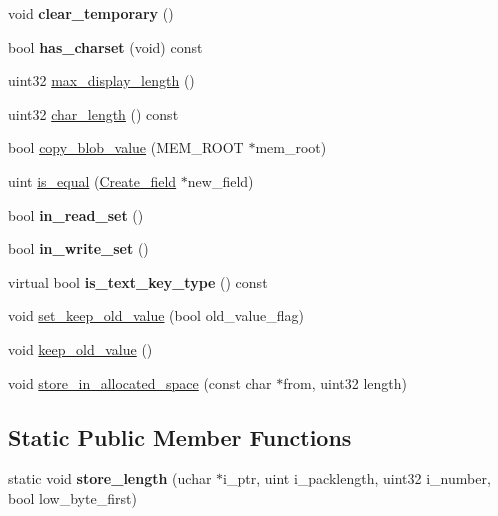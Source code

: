 \begin{DoxyCompactItemize}
\mbox{\label{classField__blob_ae641858be5af69680ab08ab07e4a87f3}} 
void {\bfseries clear\+\_\+temporary} ()
\item 
\mbox{\label{classField__blob_a9f63570780e08d9642f43f8beb7b5bf4}} 
bool {\bfseries has\+\_\+charset} (void) const
\item 
uint32 \mbox{\hyperlink{classField__blob_a6f8231d7a8e2b8f319cf9bfc1a284252}{max\+\_\+display\+\_\+length}} ()
\item 
uint32 \mbox{\hyperlink{classField__blob_af7479466787f51794b98d42baf338741}{char\+\_\+length}} () const
\item 
bool \mbox{\hyperlink{classField__blob_ac822037d569ad65e04c3f938382eef0b}{copy\+\_\+blob\+\_\+value}} (M\+E\+M\+\_\+\+R\+O\+OT $\ast$mem\+\_\+root)
\item 
uint \mbox{\hyperlink{classField__blob_aad2a7c5fe21d9c7cfd20aeea52c58ed5}{is\+\_\+equal}} (\mbox{\hyperlink{classCreate__field}{Create\+\_\+field}} $\ast$new\+\_\+field)
\item 
\mbox{\label{classField__blob_a6c2520d63239eab6b34df9dad01e8465}} 
bool {\bfseries in\+\_\+read\+\_\+set} ()
\item 
\mbox{\label{classField__blob_ab6daaeb939f4d593ac5904c7acbc4ae1}} 
bool {\bfseries in\+\_\+write\+\_\+set} ()
\item 
\mbox{\label{classField__blob_a652befb9546950a2c69fa7496fd734c9}} 
virtual bool {\bfseries is\+\_\+text\+\_\+key\+\_\+type} () const
\item 
void \mbox{\hyperlink{classField__blob_a5a73701a5ea46d5f788f4d6b32405a9b}{set\+\_\+keep\+\_\+old\+\_\+value}} (bool old\+\_\+value\+\_\+flag)
\item 
void \mbox{\hyperlink{classField__blob_ac227ff512cca0c54fb2942fffb00e4ca}{keep\+\_\+old\+\_\+value}} ()
\item 
void \mbox{\hyperlink{classField__blob_aca7b873b7d2f2ddef55bffd625180736}{store\+\_\+in\+\_\+allocated\+\_\+space}} (const char $\ast$from, uint32 length)
\end{DoxyCompactItemize}
\subsection*{Static Public Member Functions}
\begin{DoxyCompactItemize}
\item 
\mbox{\label{classField__blob_ad64b0aa498af0577afb2e0765d4514c5}} 
static void {\bfseries store\+\_\+length} (uchar $\ast$i\+\_\+ptr, uint i\+\_\+packlength, uint32 i\+\_\+number, bool low\+\_\+byte\+\_\+first)
\end{DoxyCompactItemize}
